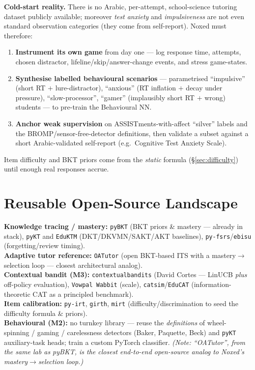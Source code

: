 \documentclass[11pt]{article}
\begin{document}
\smallskip
\noindent\textbf{Cold-start reality.} There is no Arabic, per-attempt, school-science tutoring dataset publicly available; moreover \emph{test anxiety} and \emph{impulsiveness} are not even standard observation categories (they come from self-report). Noxed must therefore:
\begin{enumerate}[leftmargin=1.4em,itemsep=1pt]
\item \textbf{Instrument its own game} from day one --- log response time, attempts, chosen distractor, lifeline/skip/answer-change events, and stress game-states.
\item \textbf{Synthesise labelled behavioural scenarios} --- parametrised ``impulsive'' (short RT $+$ lure-distractor), ``anxious'' (RT inflation $+$ decay under pressure), ``slow-processor'', ``gamer'' (implausibly short RT $+$ wrong) students --- to pre-train the Behavioural NN.
\item \textbf{Anchor weak supervision} on ASSISTments-with-affect ``silver'' labels and the BROMP/sensor-free-detector definitions, then validate a subset against a short Arabic-validated self-report (e.g.\ Cognitive Test Anxiety Scale).
\end{enumerate}
Item difficulty and BKT priors come from the \emph{static} formula (\S\ref{sec:difficulty}) until enough real responses accrue.

\section{Reusable Open-Source Landscape}
\textbf{Knowledge tracing / mastery:} \texttt{pyBKT} (BKT priors \& mastery --- already in stack), \texttt{pyKT} and \texttt{EduKTM} (DKT/DKVMN/SAKT/AKT baselines), \texttt{py-fsrs}/\texttt{ebisu} (forgetting/review timing).\\
\textbf{Adaptive tutor reference:} \texttt{OATutor} (open BKT-based ITS with a mastery$\rightarrow$selection loop --- closest architectural analog).\\
\textbf{Contextual bandit (M3):} \texttt{contextualbandits} (David Cortes --- LinUCB \emph{plus} off-policy evaluation), \texttt{Vowpal Wabbit} (scale), \texttt{catsim}/\texttt{EduCAT} (information-theoretic CAT as a principled benchmark).\\
\textbf{Item calibration:} \texttt{py-irt}, \texttt{girth}, \texttt{mirt} (difficulty/discrimination to seed the difficulty formula \& priors).\\
\textbf{Behavioural (M2):} no turnkey library --- reuse the \emph{definitions} of wheel-spinning / gaming / carelessness detectors (Baker, Paquette, Beck) and \texttt{pyKT} auxiliary-task heads; train a custom PyTorch classifier. \emph{(Note: ``OATutor'', from the same lab as pyBKT, is the closest end-to-end open-source analog to Noxed's mastery$\rightarrow$selection loop.)}
\end{document}

